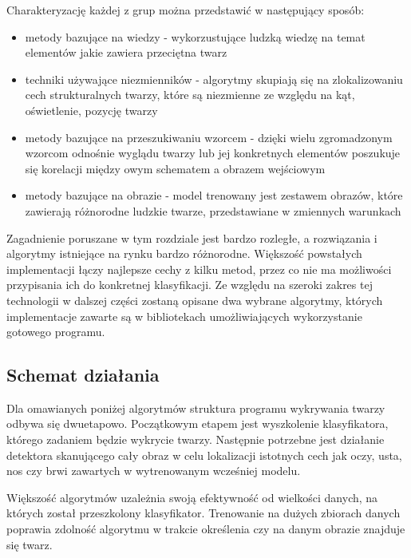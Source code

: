 Charakteryzację każdej z grup \cite{Yang} można przedstawić w następujący sposób:
\begin{itemize}
    \item metody bazujące na wiedzy - wykorzustujące ludzką wiedzę na temat elementów jakie zawiera przeciętna twarz
    \item techniki używające niezmienników - algorytmy skupiają się na zlokalizowaniu cech strukturalnych twarzy, które są niezmienne ze względu na kąt, oświetlenie, pozycję twarzy
    \item metody bazujące na przeszukiwaniu wzorcem - dzięki wielu zgromadzonym wzorcom odnośnie wyglądu twarzy lub jej konkretnych elementów poszukuje się korelacji między owym schematem a obrazem wejściowym
    \item metody bazujące na obrazie - model trenowany jest zestawem obrazów, które zawierają różnorodne ludzkie twarze, przedstawiane w zmiennych warunkach
\end{itemize}
Zagadnienie poruszane w tym rozdziale jest bardzo rozległe, a rozwiązania i algorytmy istniejące na rynku bardzo różnorodne. Większość powstałych implementacji łączy najlepsze cechy z kilku metod, przez co nie ma możliwości przypisania ich do konkretnej klasyfikacji. Ze względu na szeroki zakres tej technologii w dalszej części zostaną opisane dwa wybrane algorytmy, których implementacje zawarte są w bibliotekach umożliwiających wykorzystanie gotowego programu.

\subsection{Schemat działania}

Dla omawianych poniżej algorytmów struktura programu wykrywania twarzy odbywa się dwuetapowo. Początkowym etapem jest wyszkolenie klasyfikatora, którego zadaniem będzie wykrycie twarzy. Następnie potrzebne jest działanie detektora skanującego cały obraz w celu lokalizacji istotnych cech jak oczy, usta, nos czy brwi zawartych w wytrenowanym wcześniej modelu.

Większość algorytmów uzależnia swoją efektywność od wielkości danych, na których został przeszkolony klasyfikator. Trenowanie na dużych zbiorach danych poprawia zdolność algorytmu w trakcie określenia czy na danym obrazie znajduje się twarz. \cite{fDetection}

